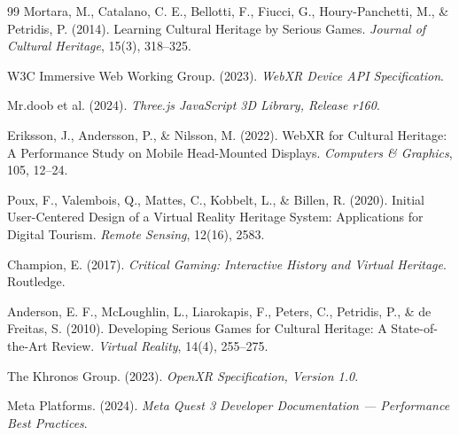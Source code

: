 \begin{thebibliography}{99}
Mortara, M., Catalano, C. E., Bellotti, F., Fiucci, G., Houry-Panchetti, M., \& Petridis, P. (2014).
Learning Cultural Heritage by Serious Games.
\textit{Journal of Cultural Heritage}, 15(3), 318--325.

W3C Immersive Web Working Group. (2023).
\textit{WebXR Device API Specification}.

Mr.doob et al. (2024).
\textit{Three.js JavaScript 3D Library, Release r160}.

Eriksson, J., Andersson, P., \& Nilsson, M. (2022).
WebXR for Cultural Heritage: A Performance Study on Mobile Head-Mounted Displays.
\textit{Computers \& Graphics}, 105, 12--24.

Poux, F., Valembois, Q., Mattes, C., Kobbelt, L., \& Billen, R. (2020).
Initial User-Centered Design of a Virtual Reality Heritage System: Applications for Digital Tourism.
\textit{Remote Sensing}, 12(16), 2583.

Champion, E. (2017).
\textit{Critical Gaming: Interactive History and Virtual Heritage}. Routledge.

Anderson, E. F., McLoughlin, L., Liarokapis, F., Peters, C., Petridis, P., \& de Freitas, S. (2010).
Developing Serious Games for Cultural Heritage: A State-of-the-Art Review.
\textit{Virtual Reality}, 14(4), 255--275.

The Khronos Group. (2023).
\textit{OpenXR Specification, Version 1.0}.

Meta Platforms. (2024).
\textit{Meta Quest 3 Developer Documentation --- Performance Best Practices}.

\end{thebibliography}
